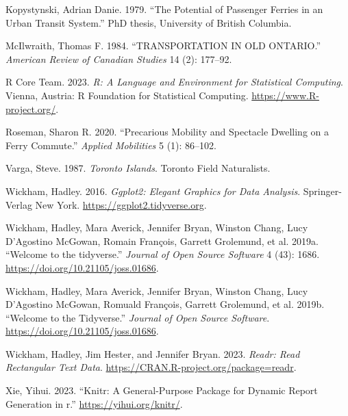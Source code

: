 \documentclass[
  letterpaper,
  DIV=11,
  numbers=noendperiod]{scrartcl}
\newlength{\cslhangindent}
\newenvironment{CSLReferences}[2] %
 {\begin{list}{}{%
  \setlength{\itemindent}{0pt}
  \setlength{\leftmargin}{0pt}
  \setlength{\parsep}{0pt}
  \ifodd #1
   \setlength{\leftmargin}{\cslhangindent}
   \setlength{\itemindent}{-1\cslhangindent}
  \fi
  \setlength{\itemsep}{#2\baselineskip}}}
 {\end{list}}
\begin{document}
\label{refs}
\begin{CSLReferences}{1}{0}
Kopystynski, Adrian Danie. 1979. {``The Potential of Passenger Ferries
in an Urban Transit System.''} PhD thesis, University of British
Columbia.

McIlwraith, Thomas F. 1984. {``TRANSPORTATION IN OLD ONTARIO.''}
\emph{American Review of Canadian Studies} 14 (2): 177--92.

R Core Team. 2023. \emph{R: A Language and Environment for Statistical
Computing}. Vienna, Austria: R Foundation for Statistical Computing.
\url{https://www.R-project.org/}.

Roseman, Sharon R. 2020. {``Precarious Mobility and Spectacle Dwelling
on a Ferry Commute.''} \emph{Applied Mobilities} 5 (1): 86--102.

Varga, Steve. 1987. \emph{Toronto Islands}. Toronto Field Naturalists.

Wickham, Hadley. 2016. \emph{Ggplot2: Elegant Graphics for Data
Analysis}. Springer-Verlag New York.
\url{https://ggplot2.tidyverse.org}.

Wickham, Hadley, Mara Averick, Jennifer Bryan, Winston Chang, Lucy
D'Agostino McGowan, Romain François, Garrett Grolemund, et al. 2019a.
{``Welcome to the {tidyverse}.''} \emph{Journal of Open Source Software}
4 (43): 1686. \url{https://doi.org/10.21105/joss.01686}.

Wickham, Hadley, Mara Averick, Jennifer Bryan, Winston Chang, Lucy
D'Agostino McGowan, Romuald François, Garrett Grolemund, et al. 2019b.
{``Welcome to the Tidyverse.''} \emph{Journal of Open Source Software}.
\url{https://doi.org/10.21105/joss.01686}.

Wickham, Hadley, Jim Hester, and Jennifer Bryan. 2023. \emph{Readr: Read
Rectangular Text Data}. \url{https://CRAN.R-project.org/package=readr}.

Xie, Yihui. 2023. {``Knitr: A General-Purpose Package for Dynamic Report
Generation in r.''} \url{https://yihui.org/knitr/}.

\end{CSLReferences}
\end{document}
